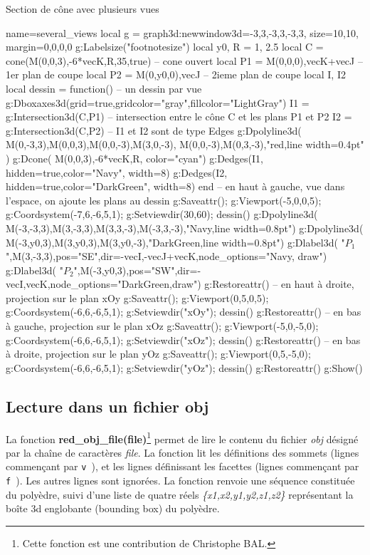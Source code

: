 \begin{demo}{Section de cône avec plusieurs vues}
\begin{luadraw}{name=several_views}
local g = graph3d:new{window3d={-3,3,-3,3,-3,3}, size={10,10}, margin={0,0,0,0}}
g:Labelsize("footnotesize")
local y0, R = 1, 2.5
local C = cone(M(0,0,3),-6*vecK,R,35,true) -- cone ouvert
local P1 = {M(0,0,0),vecK+vecJ} -- 1er plan de coupe
local P2 = {M(0,y0,0),vecJ} -- 2ieme plan de coupe
local I, I2 
local dessin = function() -- un dessin par vue
    g:Dboxaxes3d({grid=true,gridcolor="gray",fillcolor="LightGray"})
    I1 = g:Intersection3d(C,P1) -- intersection entre le cône C et les plans P1 et P2
    I2 = g:Intersection3d(C,P2) -- I1 et I2 sont de type Edges
    g:Dpolyline3d( {{M(0,-3,3),M(0,0,3),M(0,0,-3),M(3,0,-3)}, {M(0,0,-3),M(0,3,-3)}},"red,line width=0.4pt" )
    g:Dcone( M(0,0,3),-6*vecK,R, {color="cyan"})
    g:Dedges(I1, {hidden=true,color="Navy", width=8})
    g:Dedges(I2, {hidden=true,color="DarkGreen", width=8})
end
-- en haut à gauche, vue dans l'espace, on ajoute les plans au dessin
g:Saveattr(); g:Viewport(-5,0,0,5); g:Coordsystem(-7,6,-6,5,1); g:Setviewdir(30,60); dessin()
g:Dpolyline3d( {M(-3,-3,3),M(3,-3,3),M(3,3,-3),M(-3,3,-3)},"Navy,line width=0.8pt")
g:Dpolyline3d( {M(-3,y0,3),M(3,y0,3),M(3,y0,-3)},"DarkGreen,line width=0.8pt")
g:Dlabel3d( "$P_1$",M(3,-3,3),{pos="SE",dir={-vecI,-vecJ+vecK},node_options="Navy, draw"})
g:Dlabel3d( "$P_2$",M(-3,y0,3),{pos="SW",dir={-vecI,vecK},node_options="DarkGreen,draw"})
g:Restoreattr()
-- en haut à droite, projection sur le plan xOy
g:Saveattr(); g:Viewport(0,5,0,5); g:Coordsystem(-6,6,-6,5,1); g:Setviewdir("xOy"); dessin()
g:Restoreattr()
-- en bas à gauche, projection sur le plan xOz
g:Saveattr(); g:Viewport(-5,0,-5,0); g:Coordsystem(-6,6,-6,5,1); g:Setviewdir("xOz"); dessin()
g:Restoreattr()
-- en bas à droite, projection sur le plan yOz
g:Saveattr(); g:Viewport(0,5,-5,0); g:Coordsystem(-6,6,-6,5,1); g:Setviewdir("yOz"); dessin()
g:Restoreattr()
g:Show()
\end{luadraw}
\end{demo}

\subsection{Lecture dans un fichier obj}

La fonction \textbf{red\_obj\_file(file)}\footnote{Cette fonction est une contribution de Christophe BAL.} permet de lire le contenu du fichier \emph{obj} désigné par la chaîne de caractères \emph{file}. La fonction lit les définitions des sommets (lignes commençant par \verb|v |), et les lignes définissant les facettes (lignes commençant par \verb|f |). Les autres lignes sont ignorées. La fonction renvoie une séquence constituée du polyèdre, suivi d'une liste de quatre réels \emph{\{x1,x2,y1,y2,z1,z2\}} représentant la boîte 3d englobante (bounding box) du polyèdre.

